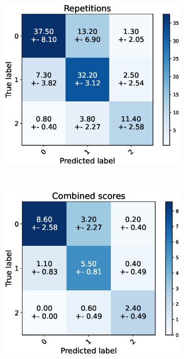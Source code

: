 \begin{figure}[h]
  \centering
  \begin{subfigure}[t]{0.48\textwidth}
      \includegraphics[width=\textwidth]{files/figs/res/trunk/cnf-reps.eps}
      \caption{}
      \label{fig:trunk-cnf-reps}
  \end{subfigure}
  ~
  \begin{subfigure}[t]{0.48\textwidth}
      \includegraphics[width=\textwidth]{files/figs/res/trunk/cnf-combined.eps}
      \caption{}
      \label{fig:trunk-cnf-comb}
  \end{subfigure}


\end{figure}
